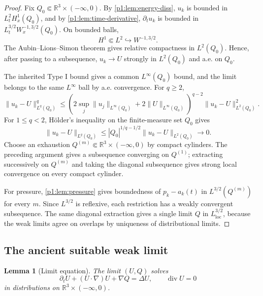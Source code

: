 \documentclass[11pt]{amsart}
\theoremstyle{plain}
\newtheorem{lemma}[lemma]{Lemma}
\theoremstyle{definition}
\theoremstyle{remark}
\numberwithin{equation}{section}
\newcommand{\R}{\mathbb R}
\newcommand{\loc}{\mathrm{loc}}
\newcommand{\divergence}{\operatorname{div}}
\begin{document}
\begin{proof}
Fix \(Q_0\Subset\R^3\times(-\infty,0)\).  By
\cref{p1:lem:energy-diss}, \(u_k\) is bounded in \(L^2_tH^1_x(Q_0)\), and by
\cref{p1:lem:time-derivative}, \(\partial_tu_k\) is bounded in
\(L^{3/2}_tW^{-1,3/2}_x(Q_0)\).  On bounded balls,
\[
   H^1\Subset L^2\hookrightarrow W^{-1,3/2}.
\]
The Aubin--Lions--Simon theorem \cite{Aubin1963,LionsMagenes,Simon1987} gives
relative compactness in \(L^2(Q_0)\).  Hence, after passing to a subsequence,
\(u_k\to U\) strongly in \(L^2(Q_0)\) and a.e. on \(Q_0\).

The inherited Type I bound gives a common \(L^\infty(Q_0)\) bound, and the
limit belongs to the same \(L^\infty\) ball by a.e. convergence.  For
\(q\ge2\),
\[
   \|u_k-U\|_{L^q(Q_0)}^q
   \le
   (2\sup_j\|u_j\|_{L^\infty(Q_0)}+2\|U\|_{L^\infty(Q_0)})^{q-2}
   \|u_k-U\|_{L^2(Q_0)}^2.
\]
For \(1\le q<2\), H\"older's inequality on the finite-measure set \(Q_0\)
gives
\[
   \|u_k-U\|_{L^q(Q_0)}
   \le |Q_0|^{1/q-1/2}\|u_k-U\|_{L^2(Q_0)}\to0.
\]
Choose an exhaustion \(Q^{(m)}\Subset\R^3\times(-\infty,0)\) by compact
cylinders.  The preceding argument gives a subsequence converging on
\(Q^{(1)}\); extracting successively on \(Q^{(m)}\) and taking the diagonal
subsequence gives strong local convergence on every compact cylinder.

For pressure, \cref{p1:lem:pressure} gives boundedness of
\(p_k-a_k(t)\) in \(L^{3/2}(Q^{(m)})\) for every \(m\).  Since
\(L^{3/2}\) is reflexive, each restriction has a weakly convergent
subsequence.  The same diagonal extraction gives a single limit \(Q\) in
\(L^{3/2}_{\loc}\), because the weak limits agree on overlaps by uniqueness
of distributional limits.
\end{proof}

\subsection{The ancient suitable weak limit}

\begin{lemma}[Limit equation]\label{p1:lem:limit-equation}
The limit \((U,Q)\) solves
\[
   \partial_tU+(U\cdot\nabla)U+\nabla Q=\Delta U,\qquad
   \divergence U=0
\]
in distributions on \(\R^3\times(-\infty,0)\).
\end{lemma}
\end{document}

